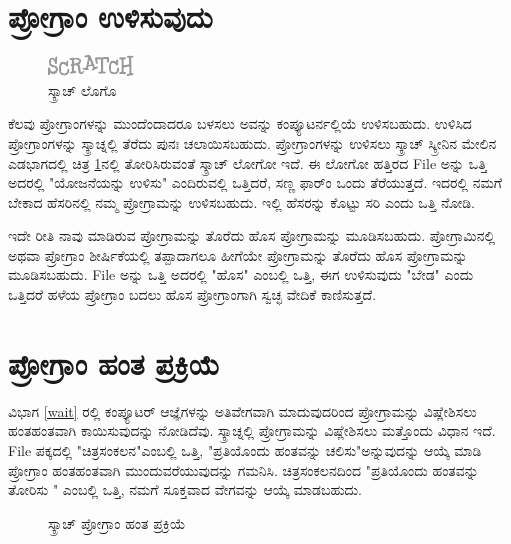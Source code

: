 \section{ಪ್ರೋಗ್ರಾಂ ಉಳಿಸುವುದು}
\begin{figure}[h]
\begin{center}
\includegraphics[scale=2]{Scratchlogo.pdf}
\end{center}
\caption{ಸ್ಕ್ರಾಚ್ ಲೊಗೊ}
\label{hdr_logo}
\end{figure}

ಕೆಲವು ಪ್ರೋಗ್ರಾಂಗಳನ್ನು ಮುಂದೆಂದಾದರೂ ಬಳಸಲು ಅವನ್ನು ಕಂಪ್ಯೂಟರ್ನಲ್ಲಿಯೆ ಉಳಿಸಬಹುದು. ಉಳಿಸಿದ ಪ್ರೋಗ್ರಾಂಗಳನ್ನು ಸ್ಕ್ರಾಚ್ನಲ್ಲಿ ತೆರೆದು ಪುನಃ ಚಲಾಯಿಸಬಹುದು.   ಪ್ರೋಗ್ರಾಂಗಳನ್ನು  ಉಳಿಸಲು ಸ್ಕ್ರಾಚ್ ಸ್ಕ್ರೀನಿನ ಮೇಲಿನ ಎಡಭಾಗದಲ್ಲಿ ಚಿತ್ರ \ref{hdr_logo}ನಲ್ಲಿ ತೋರಿಸಿರುವಂತೆ ಸ್ಕ್ರಾಚ್ ಲೋಗೋ ಇದೆ. ಈ ಲೋಗೋ ಹತ್ತಿರದ \textenglish{File} ಅನ್ನು ಒತ್ತಿ ಅದರಲ್ಲಿ "ಯೋಜನೆಯನ್ನು ಉಳಿಸು" ಎಂದಿರುವಲ್ಲಿ ಒತ್ತಿದರೆ, ಸಣ್ಣ ಫಾರ್ಂ ಒಂದು ತೆರೆಯುತ್ತದೆ.  ಇದರಲ್ಲಿ ನಮಗೆ ಬೇಕಾದ ಹೆಸರಿನಲ್ಲಿ ನಮ್ಮ ಪ್ರೋಗ್ರಾಮನ್ನು ಉಳಿಸಬಹುದು.  ಇಲ್ಲಿ ಹೆಸರನ್ನು ಕೊಟ್ಟು ಸರಿ ಎಂದು ಒತ್ತಿ ನೋಡಿ. 

ಇದೇ ರೀತಿ ನಾವು ಮಾಡಿರುವ ಪ್ರೋಗ್ರಾಮನ್ನು ತೊರೆದು ಹೊಸ ಪ್ರೋಗ್ರಾಮನ್ನು ಮೂಡಿಸಬಹುದು.  ಪ್ರೋಗ್ರಾಮಿನಲ್ಲಿ ಅಥವಾ ಪ್ರೋಗ್ರಾಂ ಶೀರ್ಷಿಕೆಯಲ್ಲಿ ತಪ್ಪಾದಾಗಲೂ ಹೀಗೆಯೇ  ಪ್ರೋಗ್ರಾಮನ್ನು ತೊರೆದು ಹೊಸ ಪ್ರೋಗ್ರಾಮನ್ನು ಮೂಡಿಸಬಹುದು. \textenglish{File} ಅನ್ನು ಒತ್ತಿ ಅದರಲ್ಲಿ "ಹೊಸ" ಎಂಬಲ್ಲಿ ಒತ್ತಿ, ಈಗ ಉಳಿಸುವುದು "ಬೇಡ" ಎಂದು ಒತ್ತಿದರೆ ಹಳೆಯ ಪ್ರೋಗ್ರಾಂ ಬದಲು ಹೊಸ ಪ್ರೋಗ್ರಾಂಗಾಗಿ ಸ್ವಚ್ಛ ವೇದಿಕೆ ಕಾಣಿಸುತ್ತದೆ. 

\section{ಪ್ರೋಗ್ರಾಂ ಹಂತ ಪ್ರಕ್ರಿಯೆ}
ವಿಭಾಗ \ref{wait} ರಲ್ಲಿ ಕಂಪ್ಯೂಟರ್ ಆಜ್ಞೆಗಳನ್ನು ಅತಿವೇಗವಾಗಿ ಮಾದುವುದರಿಂದ ಪ್ರೋಗ್ರಾಮನ್ನು ವಿಷ್ಲೇಶಿಸಲು ಹಂತಹಂತವಾಗಿ ಕಾಯಿಸುವುದನ್ನು ನೋಡಿದೆವು. ಸ್ಕ್ರಾಚ್ನಲ್ಲಿ ಪ್ರೋಗ್ರಾಮನ್ನು ವಿಷ್ಲೇಶಿಸಲು ಮತ್ತೊಂದು ವಿಧಾನ ಇದೆ. \textenglish{File}  ಪಕ್ಕದಲ್ಲಿ "ಚಿತ್ರಸಂಕಲನ"ಎಂಬಲ್ಲಿ ಒತ್ತಿ, "ಪ್ರತಿಯೊಂದು ಹಂತವನ್ನು ಚಲಿಸು"ಅನ್ನುವುದನ್ನು ಆಯ್ಕೆ ಮಾಡಿ ಪ್ರೋಗ್ರಾಂ  ಹಂತಹಂತವಾಗಿ ಮುಂದುವರೆಯುವುದನ್ನು ಗಮನಿಸಿ.  ಚಿತ್ರಸಂಕಲನದಿಂದ "ಪ್ರತಿಯೊಂದು ಹಂತವನ್ನು ತೋರಿಸು " ಎಂಬಲ್ಲಿ ಒತ್ತಿ, ನಮಗೆ ಸೂಕ್ತವಾದ ವೇಗವನ್ನು ಆಯ್ಕೆ ಮಾಡಬಹುದು.

\begin{figure}[t]
\begin{center}
\begin{Scratch}[1]
\beginbox{}
\end{Scratch}
\end{center}
\caption{ಸ್ಕ್ರಾಚ್ ಪ್ರೋಗ್ರಾಂ ಹಂತ ಪ್ರಕ್ರಿಯೆ}
\label{hdr_sstep}
\end{figure}
